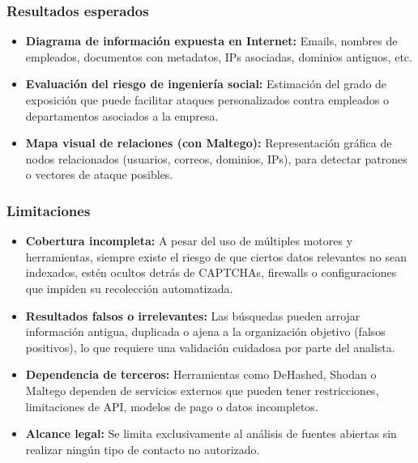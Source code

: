 \documentclass[a4paper, 11pt]{article}
\begin{document}
\subsubsection*{Resultados esperados}

\begin{itemize}
    \item \textbf{Diagrama de información expuesta en Internet:} Emails, nombres de empleados, documentos con metadatos, IPs asociadas, dominios antiguos, etc.
    \item \textbf{Evaluación del riesgo de ingeniería social:} Estimación del grado de exposición que puede facilitar ataques personalizados contra empleados o departamentos asociados a la empresa.
    \item \textbf{Mapa visual de relaciones (con Maltego):} Representación gráfica de nodos relacionados (usuarios, correos, dominios, IPs), para detectar patrones o vectores de ataque posibles.
\end{itemize}

\vspace{0.5cm}

\subsubsection*{Limitaciones}

\begin{itemize}
\item \textbf{Cobertura incompleta:} A pesar del uso de múltiples motores y herramientas, siempre existe el riesgo de que ciertos datos relevantes no sean indexados, estén ocultos detrás de CAPTCHAs, firewalls o configuraciones que impiden su recolección automatizada.

\item \textbf{Resultados falsos o irrelevantes:} Las búsquedas pueden arrojar información antigua, duplicada o ajena a la organización objetivo (falsos positivos), lo que requiere una validación cuidadosa por parte del analista.    

\item \textbf{Dependencia de terceros:} Herramientas como DeHashed, Shodan o Maltego dependen de servicios externos que pueden tener restricciones, limitaciones de API, modelos de pago o datos incompletos.

\item \textbf{Alcance legal:} Se limita exclusivamente al análisis de fuentes abiertas sin realizar ningún tipo de contacto no autorizado.
\end{itemize}
\end{document}
